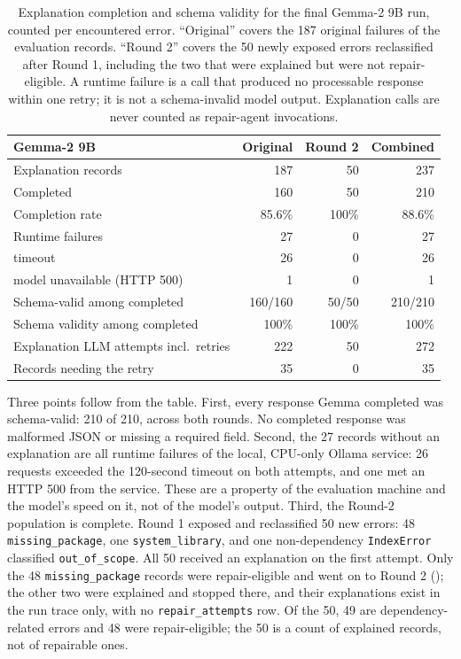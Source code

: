 \begin{table}[htbp]
  \centering
  \small
  \begin{tabular}{|p{5.9cm}|r|r|r|}
    \hline
    \textbf{Gemma-2 9B} & \textbf{Original} & \textbf{Round 2} & \textbf{Combined} \\
    \hline
    Explanation records & 187 & 50 & 237 \\
    \hline
    Completed & 160 & 50 & 210 \\
    \hline
    Completion rate & 85.6\% & 100\% & 88.6\% \\
    \hline
    Runtime failures & 27 & 0 & 27 \\
    \hspace{1em}timeout & 26 & 0 & 26 \\
    \hspace{1em}model unavailable (HTTP 500) & 1 & 0 & 1 \\
    \hline
    Schema-valid among completed & 160/160 & 50/50 & 210/210 \\
    \hline
    Schema validity among completed & 100\% & 100\% & 100\% \\
    \hline
    Explanation LLM attempts incl.\ retries & 222 & 50 & 272 \\
    \hline
    Records needing the retry & 35 & 0 & 35 \\
    \hline
  \end{tabular}
  \caption{Explanation completion and schema validity for the final Gemma-2
  9B run, counted per encountered error. ``Original'' covers the 187
  original failures of the evaluation records. ``Round 2'' covers the 50
  newly exposed errors reclassified after Round 1, including the two that
  were explained but were not repair-eligible. A runtime failure is a call
  that produced no
  processable response within one retry; it is not a schema-invalid model
  output. Explanation calls are never counted as repair-agent
  invocations.}
  \label{tab:v-final-explanation}
\end{table}

Three points follow from the table. First, every response Gemma completed
was schema-valid: 210 of 210, across both rounds. No completed response
was malformed JSON or missing a required field. Second, the 27 records
without an explanation are all runtime failures of the local, CPU-only
Ollama service: 26 requests exceeded the 120-second timeout on both
attempts, and one met an HTTP 500 from the service. These are a property
of the evaluation machine and the model's speed on it, not of the model's
output. Third, the Round-2 population is complete. Round 1 exposed and
reclassified 50 new errors: 48 \texttt{missing\_package}, one
\texttt{system\_library}, and one non-dependency \texttt{IndexError}
classified \texttt{out\_of\_scope}. All 50 received an explanation on the
first attempt. Only the 48 \texttt{missing\_package} records were
repair-eligible and went on to Round 2 ();
the other two were explained and stopped there, and their explanations
exist in the run trace only, with no \texttt{repair\_attempts} row. Of
the 50, 49 are dependency-related errors and 48 were repair-eligible; the
50 is a count of explained records, not of repairable ones.


